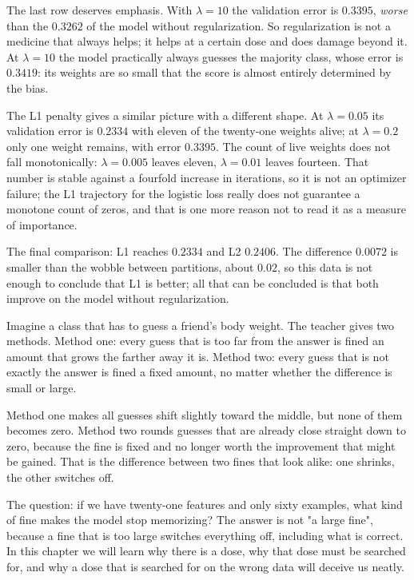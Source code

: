 The last row deserves emphasis. With $\lambda=10$ the validation error is $0.3395$,
\emph{worse} than the $0.3262$ of the model without regularization. So regularization
is not a medicine that always helps; it helps at a certain dose and does damage
beyond it. At $\lambda=10$ the model practically always guesses the majority class,
whose error is $0.3419$: its weights are so small that the score is almost entirely
determined by the bias.

The L1 penalty gives a similar picture with a different shape. At $\lambda=0.05$ its
validation error is $0.2334$ with eleven of the twenty-one weights alive; at
$\lambda=0.2$ only one weight remains, with error $0.3395$. The count of live weights
does not fall monotonically: $\lambda=0.005$ leaves eleven, $\lambda=0.01$ leaves
fourteen. That number is stable against a fourfold increase in iterations, so it is
not an optimizer failure; the L1 trajectory for the logistic loss really does not
guarantee a monotone count of zeros, and that is one more reason not to read it as a
measure of importance.

The final comparison: L1 reaches $0.2334$ and L2 $0.2406$. The difference $0.0072$ is
smaller than the wobble between partitions, about $0.02$, so this data is not enough
to conclude that L1 is better; all that can be concluded is that both improve on the
model without regularization.
\begin{untukanak}
Imagine a class that has to guess a friend's body weight. The teacher gives two
methods. Method one: every guess that is too far from the answer is fined an amount
that grows the farther away it is. Method two: every guess that is not exactly the
answer is fined a fixed amount, no matter whether the difference is small or large.

Method one makes all guesses shift slightly toward the middle, but none of them
becomes zero. Method two rounds guesses that are already close straight down to
zero, because the fine is fixed and no longer worth the improvement that might be
gained. That is the difference between two fines that look alike: one shrinks, the
other switches off.

The question: if we have twenty-one features and only sixty examples, what kind of
fine makes the model stop memorizing? The answer is not "a large fine", because a
fine that is too large switches everything off, including what is correct. In this
chapter we will learn why there is a dose, why that dose must be searched for, and
why a dose that is searched for on the wrong data will deceive us neatly.
\end{untukanak}

